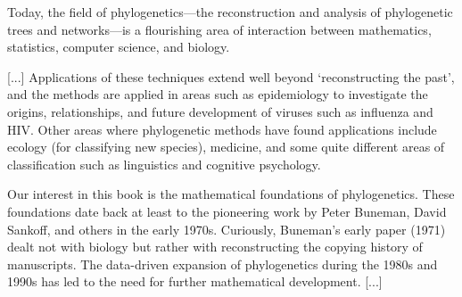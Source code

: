 \documentclass[./main.tex]{subfiles}
\begin{document}
\begin{displayquote}
    Today, the field of phylogenetics---the reconstruction and analysis of phylogenetic trees and networks---is a flourishing area of interaction between mathematics, statistics, computer science, and biology.\par
    \textup{[...]} Applications of these techniques extend well beyond `reconstructing the past', and the methods are applied in areas such as epidemiology to investigate the origins, relationships, and future development of viruses such as influenza and HIV. Other areas where phylogenetic methods have found applications include ecology (for classifying new species), medicine, and some quite different areas of classification such as linguistics and cognitive psychology.\par
    Our interest in this book is the mathematical foundations of phylogenetics. These foundations date back at least to the pioneering work by Peter Buneman, David Sankoff, and others in the early 1970s. Curiously, Buneman's early paper (1971) dealt not with biology but rather with reconstructing the copying history of manuscripts. The data-driven expansion of phylogenetics during the 1980s and 1990s has led to the need for further mathematical development. \textup{[...]}
\end{displayquote}
\end{document}
